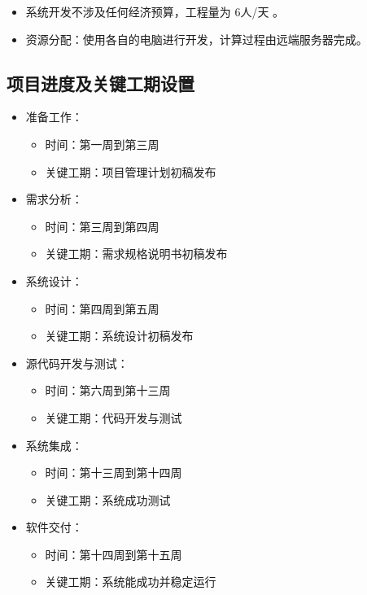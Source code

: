 \documentclass[
  hyperref, a4paper]{ctexart}
\providecommand{\tightlist}{%
  \setlength{\itemsep}{0pt}\setlength{\parskip}{0pt}}
\begin{document}
\begin{itemize}
\tightlist
\item
  系统开发不涉及任何经济预算，工程量为 6人/天 。
\item
  资源分配：使用各自的电脑进行开发，计算过程由远端服务器完成。
\end{itemize}

\hypertarget{ux9879ux76eeux8fdbux5ea6ux53caux5173ux952eux5de5ux671fux8bbeux7f6e-1}{%
\subsection{项目进度及关键工期设置}\label{ux9879ux76eeux8fdbux5ea6ux53caux5173ux952eux5de5ux671fux8bbeux7f6e-1}}

\begin{itemize}
\tightlist
\item
  准备工作：

  \begin{itemize}
  \tightlist
  \item
    时间：第一周到第三周
  \item
    关键工期：项目管理计划初稿发布
  \end{itemize}
\item
  需求分析：

  \begin{itemize}
  \tightlist
  \item
    时间：第三周到第四周
  \item
    关键工期：需求规格说明书初稿发布
  \end{itemize}
\item
  系统设计：

  \begin{itemize}
  \tightlist
  \item
    时间：第四周到第五周
  \item
    关键工期：系统设计初稿发布
  \end{itemize}
\item
  源代码开发与测试：

  \begin{itemize}
  \tightlist
  \item
    时间：第六周到第十三周
  \item
    关键工期：代码开发与测试
  \end{itemize}
\item
  系统集成：

  \begin{itemize}
  \tightlist
  \item
    时间：第十三周到第十四周
  \item
    关键工期：系统成功测试
  \end{itemize}
\item
  软件交付：

  \begin{itemize}
  \tightlist
  \item
    时间：第十四周到第十五周
  \item
    关键工期：系统能成功并稳定运行
  \end{itemize}
\end{itemize}
\end{document}
